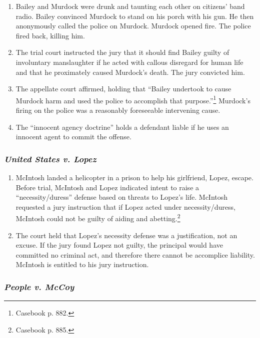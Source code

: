 \begin{enumerate}
    \item Bailey and Murdock were drunk and taunting each other on citizens' 
    band radio. Bailey convinced Murdock to stand on his porch with his gun. 
    He then anonymously called the police on Murdock. Murdock opened fire. The 
    police fired back, killing him.
    \item The trial court instructed the jury that it should find Bailey 
    guilty of involuntary manslaughter if he acted with callous disregard for 
    human life and that he proximately caused Murdock's death. The jury 
    convicted him.
    \item The appellate court affirmed, holding that ``Bailey undertook to 
    cause Murdock harm and used the police to accomplish that 
    purpose.''\footnote{Casebook p. 882.} Murdock's firing on the police was a 
    reasonably foreseeable intervening cause.
    \item The ``innocent agency doctrine'' holds a defendant liable if he 
    uses an innocent agent to commit the offense.
\end{enumerate}

\subsubsection{\emph{United States v. Lopez}}

\begin{enumerate}
    \item McIntosh landed a helicopter in a prison to help his girlfriend, 
    Lopez, escape. Before trial, McIntosh and Lopez indicated intent to raise 
    a ``necessity/duress'' defense based on threats to Lopez's life. McIntosh 
    requested a jury instruction that if Lopez acted under necessity/duress, 
    McIntosh could not be guilty of aiding and abetting.\footnote{Casebook p. 
    885.}
    \item The court held that Lopez's necessity defense was a justification, 
    not an excuse. If the jury found Lopez not guilty, the principal would 
    have committed no criminal act, and therefore there cannot be accomplice 
    liability. McIntosh is entitled to his jury instruction.
\end{enumerate}

\subsubsection{\emph{People v. McCoy}}

